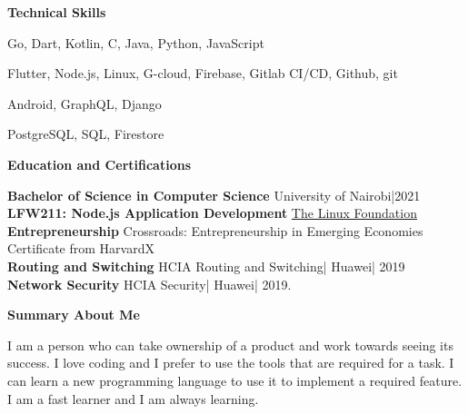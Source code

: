 \documentclass[a4paper]{article}
\begin{document}
\begin{center}
    {\Large \textbf{Technical Skills}}
\end{center}

\begin{description}[noitemsep]
    \item[Languages:] Go, Dart, Kotlin, C, Java, Python, JavaScript
    \item[Platforms and tools:] Flutter, Node.js, Linux, G-cloud, Firebase, Gitlab CI/CD, Github, git
    \item[Frameworks:] Android, GraphQL, Django
    \item[Databases:] PostgreSQL, SQL, Firestore
\end{description}

\begin{center}
    {\Large \textbf{Education and Certifications}}
\end{center}

\textbf{Bachelor of Science in Computer Science} University of Nairobi|2021 \\
\textbf{LFW211: Node.js Application Development} \href{https://www.credly.com/badges/68a3a563-1ec2-437b-9d66-2ce3dee5c8aa?source=linked_in_profile}{The Linux Foundation} \\
\textbf{Entrepreneurship} Crossroads: Entrepreneurship in Emerging Economies Certificate from HarvardX \\
\textbf{Routing and Switching} HCIA Routing and Switching| Huawei| 2019 \\
\textbf{Network Security} HCIA Security| Huawei| 2019. \par

\begin{center}
    {\Large \textbf{Summary About Me}}
\end{center}

I am a person who can take ownership of a product and work towards seeing its success. I love coding and I prefer to use the tools that are required for a task. I can learn a new programming language to use it to implement a required feature. I am a fast learner and I am always learning.

\end{document}
